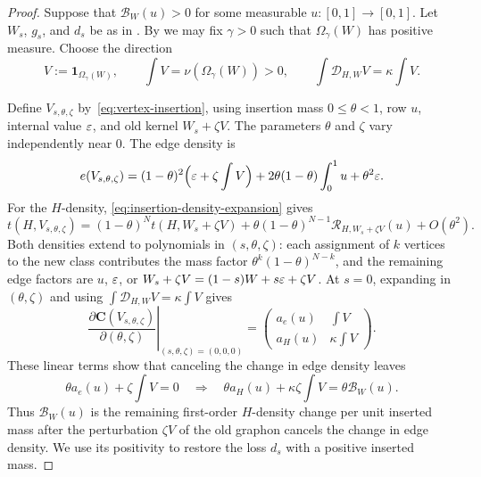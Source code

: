 \begin{proof}
Suppose that $\mathcal B_W(u)>0$ for some measurable $u:[0,1]\to[0,1]$.
Let $W_s$, $g_s$, and $d_s$ be as in .
By  we may fix $\gamma>0$ such that
$\Omega_\gamma(W)$ has positive measure. Choose the direction
\[
  V:=\mathbf1_{\Omega_\gamma(W)},
  \qquad \int V=\nu(\Omega_\gamma(W))>0,
  \qquad \int\mathcal D_{H,W}V=\kappa\int V.
\]

Define $V_{s,\theta,\zeta}$ by~\eqref{eq:vertex-insertion}, using insertion
mass $0\le\theta<1$, row $u$, internal value $\varepsilon$, and old kernel
$W_s+\zeta V$. The parameters $\theta$ and $\zeta$
vary independently near $0$.
The edge density is
\[
  e(V_{s,\theta,\zeta})
  =(1-\theta)^2\Bigl(\varepsilon+\zeta\int V\Bigr)
    +2\theta(1-\theta)\int_0^1u+\theta^2\varepsilon.
\]
For the $H$-density, \eqref{eq:insertion-density-expansion} gives
\[
  t(H,V_{s,\theta,\zeta})
  =(1-\theta)^N t(H,W_s+\zeta V)
    +\theta(1-\theta)^{N-1}\mathcal R_{H,W_s+\zeta V}(u)+O(\theta^2).
\]
Both densities extend to polynomials in $(s,\theta,\zeta)$: each
assignment of $k$ vertices to the new class contributes the mass factor
$\theta^k(1-\theta)^{N-k}$, and the remaining edge factors are $u$, $\varepsilon$, or
$W_s+\zeta V=(1-s)W+s\varepsilon+\zeta V$.
At $s=0$, expanding in $(\theta,\zeta)$ and using
$\int\mathcal D_{H,W}V=\kappa\int V$ gives
\[
  \left.\frac{\partial\mathbf C(V_{s,\theta,\zeta})}{\partial(\theta,\zeta)}
  \right|_{(s,\theta,\zeta)=(0,0,0)}
  =
  \begin{pmatrix}
    a_e(u) & \int V\\[1mm]
    a_H(u) & \kappa\int V
  \end{pmatrix}.
\]
These linear terms show that canceling the change in edge density leaves
\[
  \theta a_e(u)+\zeta\int V=0
  \quad\Longrightarrow\quad
  \theta a_H(u)+\kappa\zeta\int V=\theta\mathcal B_W(u).
\]
Thus $\mathcal B_W(u)$ is the remaining first-order $H$-density change
per unit inserted mass after the perturbation $\zeta V$ of the old graphon
cancels the change in edge density. We use its positivity to restore
the loss $d_s$ with a positive inserted mass.


\end{proof}
